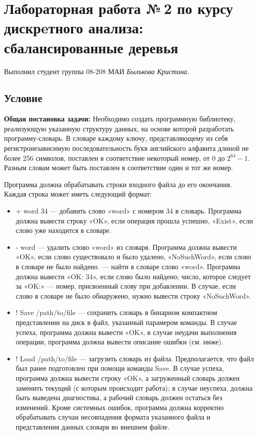 \documentclass[12pt]{article}
\begin{document}
\section*{Лабораторная работа №\,2 по курсу дискрeтного анализа: сбалансированные деревья}

\noindent Выполнил студент группы 08-208 МАИ \textit{Былькова Кристина}.

\subsection*{Условие}
\textbf{Общая постановка задачи:} Необходимо создать программную библиотеку, реализующую указанную структуру данных, на основе которой разработать программу-словарь. В словаре каждому ключу, представляющему из себя регистронезависимую последовательность букв английского алфавита длиной не более 256 символов, поставлен в соответствие некоторый номер, от 0 до ${2^{64} - 1}$. Разным словам может быть поставлен в соответствие один и тот же номер.

Программа должна обрабатывать строки входного файла до его окончания. Каждая строка может иметь следующий формат:
\begin{itemize}
\item+ word 34 — добавить слово «word» с номером 34 в словарь. Программа должна вывести строку «OK», если операция прошла успешно, «Exist», если слово уже находится в словаре.
\item- word — удалить слово «word» из словаря. Программа должна вывести «OK», если слово существовало и было удалено, «NoSuchWord», если слово в словаре не было найдено.
\itemword — найти в словаре слово «word». Программа должна вывести «OK: 34», если слово было найдено; число, которое следует за «OK:» — номер, присвоенный слову при добавлении. В случае, если слово в словаре не было обнаружено, нужно вывести строку «NoSuchWord».
\item! Save /path/to/file — сохранить словарь в бинарном компактном представлении на диск в файл, указанный парамером команды. В случае успеха, программа должна вывести «OK», в случае неудачи выполнения операции, программа должна вывести описание ошибки (см. ниже).
\item! Load /path/to/file — загрузить словарь из файла. Предполагается, что файл был ранее подготовлен при помощи команды Save. В случае успеха, программа должна вывести строку «OK», а загруженный словарь должен заменить текущий (с которым происходит работа); в случае неуспеха, должна быть выведена диагностика, а рабочий словарь должен остаться без изменений. Кроме системных ошибок, программа должна корректно обрабатывать случаи несовпадения формата указанного файла и представления данных словаря во внешнем файле.
\end{itemize}
\end{document}
